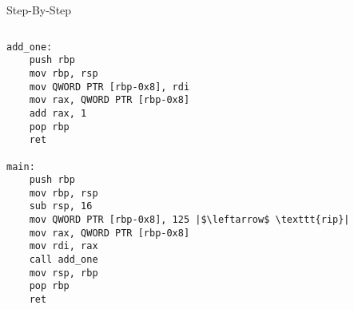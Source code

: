 \documentclass[hyphens,aspectratio=169]{beamer}
\begin{document}
\begin{frame}[fragile]{Step-By-Step}
    \begin{columns}
        \begin{column}{0.33\textwidth}
            \begin{verbatim}
add_one:
    push rbp
    mov rbp, rsp
    mov QWORD PTR [rbp-0x8], rdi
    mov rax, QWORD PTR [rbp-0x8]
    add rax, 1
    pop rbp
    ret

main:
    push rbp
    mov rbp, rsp
    sub rsp, 16
    mov QWORD PTR [rbp-0x8], 125 |$\leftarrow$ \texttt{rip}|
    mov rax, QWORD PTR [rbp-0x8]
    mov rdi, rax
    call add_one
    mov rsp, rbp
    pop rbp
    ret
            \end{verbatim}
        \end{column}
        \begin{column}{0.33\textwidth}
\end{column}
\end{columns}
\end{frame}
\end{document}

